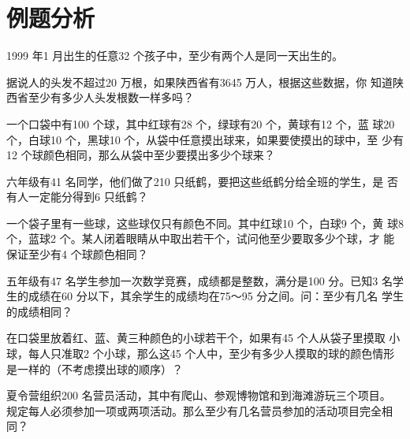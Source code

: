 \section{例题分析}
\begin{example}
    1999 年1 月出生的任意32 个孩子中，至少有两个人是同一天出生的。
\end{example}
\vspace{3cm}
\begin{example}
    据说人的头发不超过20 万根，如果陕西省有3645 万人，根据这些数据，你
知道陕西省至少有多少人头发根数一样多吗？
\end{example}
\vspace{3cm}
\begin{example}
    一个口袋中有100 个球，其中红球有28 个，绿球有20 个，黄球有12 个，蓝
球20 个，白球10 个，黑球10 个，从袋中任意摸出球来，如果要使摸出的球中，至
少有12 个球颜色相同，那么从袋中至少要摸出多少个球来？
\end{example}
\newpage
\begin{example}
    六年级有41 名同学，他们做了210 只纸鹤，要把这些纸鹤分给全班的学生，是
    否有人一定能分得到6 只纸鹤？
\end{example}
\vspace{3cm}
\begin{example}
    一个袋子里有一些球，这些球仅只有颜色不同。其中红球10 个，白球9 个，黄
    球8 个，蓝球2 个。某人闭着眼睛从中取出若干个，试问他至少要取多少个球，才
    能保证至少有4 个球颜色相同？
\end{example}
\vspace{3cm}
\begin{example}
    五年级有47 名学生参加一次数学竞赛，成绩都是整数，满分是100 分。已知3
名学生的成绩在60 分以下，其余学生的成绩均在75～95 分之间。问：至少有几名
学生的成绩相同？
\end{example}
\vspace{3cm}
\begin{example}
    在口袋里放着红、蓝、黄三种颜色的小球若干个，如果有45 个人从袋子里摸取
    小球，每人只准取2 个小球，那么这45 个人中，至少有多少人摸取的球的颜色情形
    是一样的（不考虑摸出球的顺序）？
\end{example}
\vspace{3cm}
\begin{example}
    夏令营组织200 名营员活动，其中有爬山、参观博物馆和到海滩游玩三个项目。
    规定每人必须参加一项或两项活动。那么至少有几名营员参加的活动项目完全相
    同？
\end{example}
\vspace{3cm}
